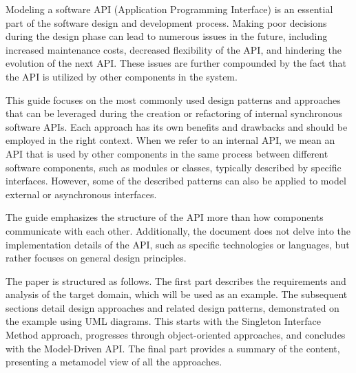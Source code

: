 Modeling a software API (Application Programming Interface) is an essential part of the software design
and development process.
Making poor decisions during the design phase can lead to numerous issues in the future, including increased
maintenance costs, decreased flexibility of the API, and hindering the evolution of the next API\@.
These issues are further compounded by the fact that the API is utilized by other components in the system.

This guide focuses on the most commonly used design patterns and approaches that can be leveraged during
the creation or refactoring of internal synchronous software APIs. Each approach has its own benefits
and drawbacks and should be employed in the right context.
When we refer to an internal API, we mean an API that is used by other components in the same process between
different software components, such as modules or classes, typically described by specific interfaces.
However, some of the described patterns can also be applied to model external or asynchronous interfaces.

The guide emphasizes the structure of the API more than how components communicate with each other.
Additionally, the document does not delve into the implementation details of the API,
such as specific technologies or languages, but rather focuses on general design principles.

The paper is structured as follows.
The first part describes the requirements and analysis of the target domain, which will be used as an example.
The subsequent sections detail design approaches and related design patterns,
demonstrated on the example using UML diagrams.
This starts with the Singleton Interface Method approach, progresses through object-oriented approaches,
and concludes with the Model-Driven API\@.
The final part provides a summary of the content, presenting a metamodel view of all the approaches.
